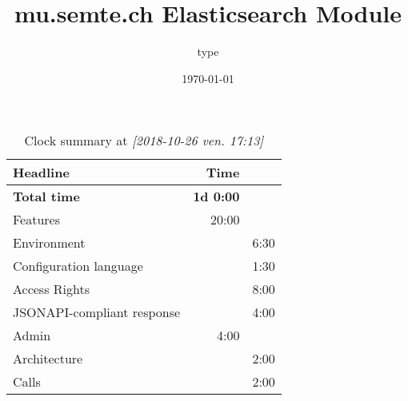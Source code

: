 \documentclass[11pt]{article}
\author{type}
\date{\today}
\title{mu.semte.ch Elasticsearch Module}
\begin{document}
\maketitle
\begin{table}[htb]
\caption{Clock summary at \textit{[2018-10-26 ven. 17:13]}}
\centering
\begin{tabular}{lrr}
Headline & Time & \\
\hline
\textbf{Total time} & \textbf{1d 0:00} & \\
\hline
Features & 20:00 & \\
\hspace*{1em} Environment &  & 6:30\\
\hspace*{1em} Configuration language &  & 1:30\\
\hspace*{1em} Access Rights &  & 8:00\\
\hspace*{1em} JSONAPI-compliant response &  & 4:00\\
Admin & 4:00 & \\
\hspace*{1em} Architecture &  & 2:00\\
\hspace*{1em} Calls &  & 2:00\\
\end{tabular}
\end{table}
\end{document}
